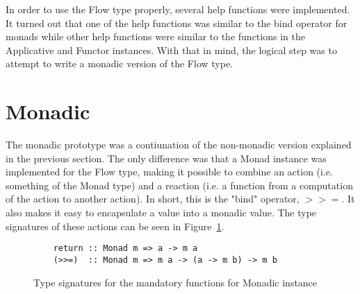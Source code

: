 In order to use the Flow type properly, several help functions were implemented. It turned out that one of the help functions was similar to the bind operator for monads while other help functions were similar to the functions in the Applicative and Functor instances. With that in mind, the logical step was to attempt to write a monadic version of the Flow type.
\section{Monadic}
The monadic prototype was a contiunation of the non-monadic version explained in the previous section. The only difference was that a Monad instance was implemented for the Flow type, making it possible to combine an action (i.e. something of the Monad type) and a reaction (i.e. a function from a computation of the action to another action). In short, this is the "bind" operator, \(>>=\). It also makes it easy to encapsulate a value into a monadic value. The type signatures of these actions can be seen in Figure~\ref{fig:monadic_actions}.
\begin{figure}[h]
  \begin{verbatim}
    return :: Monad m => a -> m a
    (>>=)  :: Monad m => m a -> (a -> m b) -> m b
  \end{verbatim}
  \caption{Type signatures for the mandatory functions for Monadic instance}
  \label{fig:monadic_actions}
\end{figure}
